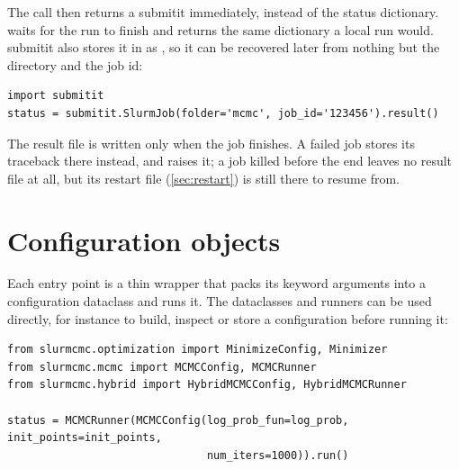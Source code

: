 The call then returns a submitit  immediately, instead of the status dictionary.
 waits for the run to finish and returns the same dictionary a local run would.
submitit also stores it in  as , so it can be recovered
later from nothing but the directory and the job id:
\begin{lstlisting}
import submitit
status = submitit.SlurmJob(folder='mcmc', job_id='123456').result()
\end{lstlisting}

\begin{keypoint}
The result file is written only when the job finishes. A failed job stores its traceback there
instead, and  raises it; a job killed before the end leaves no result file at all,
but its restart file (\cref{sec:restart}) is still there to resume from.
\end{keypoint}

\section{Configuration objects}

Each entry point is a thin wrapper that packs its keyword arguments into a configuration dataclass
and runs it. The dataclasses and runners can be used directly, for instance to build, inspect or
store a configuration before running it:
\begin{lstlisting}
from slurmcmc.optimization import MinimizeConfig, Minimizer
from slurmcmc.mcmc import MCMCConfig, MCMCRunner
from slurmcmc.hybrid import HybridMCMCConfig, HybridMCMCRunner

status = MCMCRunner(MCMCConfig(log_prob_fun=log_prob, init_points=init_points,
                               num_iters=1000)).run()
\end{lstlisting}
